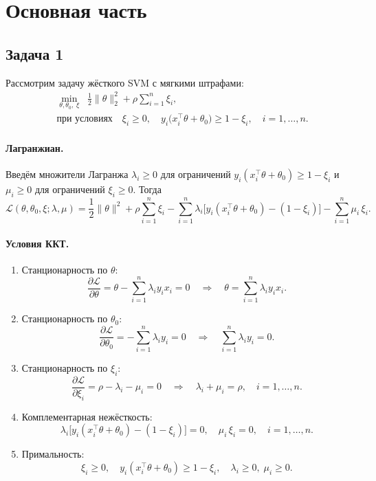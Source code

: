 \documentclass[12pt]{article}
\title{}
\author{}
\date{}
\begin{document}
	\maketitle
	
	\section*{Основная часть}
	
	\subsection*{Задача 1}
	Рассмотрим задачу жёсткого SVM с мягкими штрафами:
	\begin{align*}
		&\min_{\theta,\theta_0,\;\xi}\;\; \frac{1}{2}\|\theta\|_2^2 + \rho\sum_{i=1}^n \xi_i,\\
		&\text{при условиях}\quad
		\xi_i \ge 0,\quad
		y_i\bigl(x_i^\top\theta + \theta_0\bigr)\ge1 - \xi_i,\quad i=1,\dots,n.
	\end{align*}
	
	\paragraph{Лагранжиан.}
	Введём множители Лагранжа $\lambda_i\ge0$ для ограничений 
	$y_i(x_i^\top\theta+\theta_0)\ge1-\xi_i$
	и $\mu_i\ge0$ для ограничений $\xi_i\ge0$. Тогда
	\[
	\mathcal{L}(\theta,\theta_0,\xi;\lambda,\mu)
	= \frac12\|\theta\|^2 + \rho\sum_{i=1}^n\xi_i
	- \sum_{i=1}^n\lambda_i\bigl[y_i(x_i^\top\theta+\theta_0)-(1-\xi_i)\bigr]
	- \sum_{i=1}^n\mu_i\,\xi_i.
	\]
	
	\paragraph{Условия ККТ.}
	\begin{enumerate}
		\item Станционарность по $\theta$:
		\[
		\frac{\partial\mathcal{L}}{\partial\theta}
		= \theta - \sum_{i=1}^n \lambda_i y_i x_i = 0
		\quad\Longrightarrow\quad
		\theta = \sum_{i=1}^n \lambda_i y_i x_i.
		\]
		\item Станционарность по $\theta_0$:
		\[
		\frac{\partial\mathcal{L}}{\partial\theta_0}
		= -\sum_{i=1}^n \lambda_i y_i = 0
		\quad\Longrightarrow\quad
		\sum_{i=1}^n \lambda_i y_i = 0.
		\]
		\item Станционарность по $\xi_i$:
		\[
		\frac{\partial\mathcal{L}}{\partial\xi_i}
		= \rho - \lambda_i - \mu_i = 0
		\quad\Longrightarrow\quad
		\lambda_i + \mu_i = \rho,\quad i=1,\dots,n.
		\]
		\item Комплементарная нежёсткость:
		\[
		\lambda_i\bigl[y_i(x_i^\top\theta+\theta_0)-(1-\xi_i)\bigr]=0,
		\quad
		\mu_i\,\xi_i=0,
		\quad i=1,\dots,n.
		\]
		\item Примальность:
		\[
		\xi_i\ge0,\quad
		y_i(x_i^\top\theta+\theta_0)\ge1-\xi_i,\quad
		\lambda_i\ge0,\;\mu_i\ge0.
		\]
	\end{enumerate}
	
\end{document}
